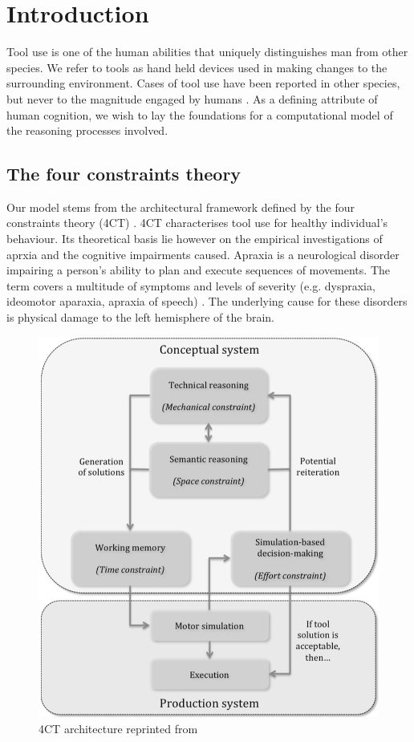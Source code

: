 \documentclass[11]{article}
\begin{document}
\section{Introduction}
Tool use is one of the human abilities that uniquely distinguishes man from other species. 
We refer to tools as hand held devices used in making changes to the surrounding environment. 
Cases of tool use have been reported in other species, but never to the magnitude engaged by humans \cite{boysen1999,harrington2009,lefebvre2004}. 
As a defining attribute of human cognition, we wish to lay the foundations for a computational model of the reasoning processes involved.

\subsection{The four constraints theory}
Our model stems from the architectural framework defined by the four constraints theory (4CT) \cite{osiurak2014a}.
4CT characterises tool use for healthy individual's behaviour.
Its theoretical basis lie however on the empirical investigations of aprxia and the cognitive impairments caused.
Apraxia is a neurological disorder impairing a person's ability to plan and execute sequences of movements.
The term covers a multitude of symptoms and levels of severity (e.g. dyspraxia, ideomotor aparaxia, apraxia of speech) .
The underlying cause for these disorders is physical damage to the left hemisphere of the brain\cite{osiurak2013}.

\begin{figure}[h]
  \centering
  \includegraphics[width=.9\textwidth]{./figures/4CTArchitecture.png}
  \caption{4CT architecture reprinted from \cite{osiurak2014a}}
  \label{fig:4CTArchitecture}
\end{figure}      
\end{document}
